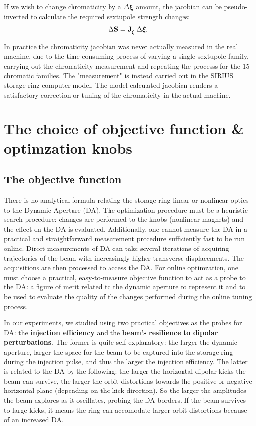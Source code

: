 If we wish to change chromaticity by a $\Delta\boldsymbol{\xi}$ amount, the jacobian can be pseudo-inverted to calculate the required sextupole strength changes:
\begin{equation}
    \Delta \vb{S} = \vb{J}_{\xi}^{+}\Delta \boldsymbol{\xi}.
\end{equation}

In practice the chromaticity jacobian was never actually measured in the real machine, due to the time-consuming process of varying a single sextupole family, carrying out the chromaticity measurement and repeating the processs for the 15 chromatic families. The "measurement" is instead carried out in the SIRIUS storage ring computer model. The model-calculated jacobian renders a satisfactory correction or tuning of the chromaticity in the actual machine.
\section{The choice of objective function \& optimzation knobs}

\subsection{The objective function}
There is no analytical formula relating the storage ring linear or nonlinear optics to the Dynamic Aperture (DA). The optimization procedure must be a heuristic search procedure: changes are performed to the knobs (nonlinear magnets) and the effect on the DA is evaluated. Additionally, one cannot measure the DA in a practical and straightforward measurement procedure sufficiently fast to be run online. Direct measurements of DA can take several iterations of acquiring trajectories of the beam with increasingly higher transverse displacements. The acquisitions are then processed to access the DA. For online optimzation, one must choose a practical, easy-to-measure objective function to act as a probe to the DA: a figure of merit related to the dynamic aperture to represent it and to be used to evaluate the quality of the changes performed during the online tuning process.

In our experiments, we studied using two practical objectives as the probes for DA: the \textbf{injection efficiency} and the \textbf{beam's resilience to dipolar perturbations}. The former is quite self-explanatory: the larger the dynamic aperture, larger the space for the beam to be captured into the storage ring during the injection pulse, and thus the larger the injection efficiency. The latter is related to the DA by the following: the larger the horizontal dipolar kicks the beam can survive, the larger the orbit distortions towards the positive or negative horizontal plane (depending on the kick direction). So the larger the amplitudes the beam explores as it oscillates, probing the DA borders. If the beam survives to large kicks, it means the ring can accomodate larger orbit distortions because of an increased DA.

